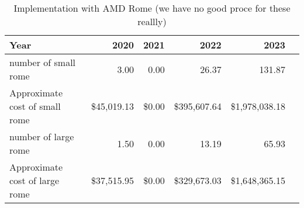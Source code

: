 \tiny \begin{longtable} { |p{}  |r  |r  |r  |r  |r |} 
\caption{Implementation with AMD Rome (we have no good proce for these reallly) \label{tab:Rome}}\\ 
\hline 
\textbf{Year}&\textbf{2020}&\textbf{2021}&\textbf{2022}&\textbf{2023} \\ \hline
{number of small rome }&{3.00}&{0.00}&{26.37}&{131.87} \\ \hline
{Approximate cost of small rome }&{\$45,019.13}&{\$0.00}&{\$395,607.64}&{\$1,978,038.18} \\ \hline
{number of large rome }&{1.50}&{0.00}&{13.19}&{65.93} \\ \hline
{Approximate cost of large rome }&{\$37,515.95}&{\$0.00}&{\$329,673.03}&{\$1,648,365.15} \\ \hline
\end{longtable} \normalsize
